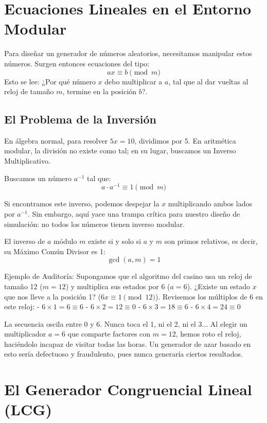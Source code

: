 \documentclass[11pt, letterpaper]{article}
\begin{document}
\section{Ecuaciones Lineales en el Entorno Modular}

Para diseñar un generador de números aleatorios, necesitamos manipular estos números. Surgen entonces ecuaciones del tipo:
$$ ax \equiv b \pmod m $$
Esto se lee: ¿Por qué número $x$ debo multiplicar a $a$, tal que al dar vueltas al reloj de tamaño $m$, termine en la posición $b$?.

\subsection{El Problema de la Inversión}
En álgebra normal, para resolver $5x = 10$, dividimos por 5. En aritmética modular, la división no existe como tal; en su lugar, buscamos un Inverso Multiplicativo.

Buscamos un número $a^{-1}$ tal que:
$$ a \cdot a^{-1} \equiv 1 \pmod m $$

Si encontramos este inverso, podemos despejar la $x$ multiplicando ambos lados por $a^{-1}$. Sin embargo, aquí yace una trampa crítica para nuestro diseño de simulación: no todos los números tienen inverso modular.

\begin{alertabox}
El inverso de $a$ módulo $m$ existe si y solo si $a$ y $m$ son primos relativos, es decir, su Máximo Común Divisor es 1:
$$ \gcd(a, m) = 1 $$
\end{alertabox}

Ejemplo de Auditoría:
Supongamos que el algoritmo del casino usa un reloj de tamaño 12 ($m=12$) y multiplica sus estados por 6 ($a=6$).
¿Existe un estado $x$ que nos lleve a la posición 1? ($6x \equiv 1 \pmod{12}$).
Revisemos los múltiplos de 6 en este reloj:
- $6 \times 1 = 6 \equiv 6$
- $6 \times 2 = 12 \equiv 0$
- $6 \times 3 = 18 \equiv 6$
- $6 \times 4 = 24 \equiv 0$

La secuencia oscila entre 0 y 6. Nunca toca el 1, ni el 2, ni el 3... Al elegir un multiplicador $a=6$ que comparte factores con $m=12$, hemos roto el reloj, haciéndolo incapaz de visitar todas las horas. Un generador de azar basado en esto sería defectuoso y fraudulento, pues nunca generaría ciertos resultados.

\section{El Generador Congruencial Lineal (LCG)}
\end{document}
